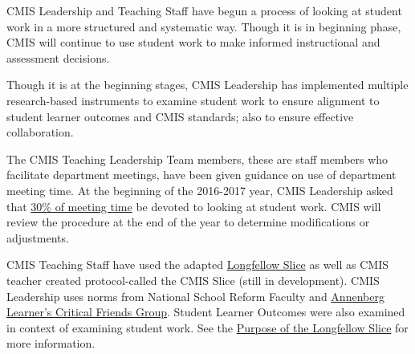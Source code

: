 \documentclass{report}
\begin{document}


\begin{findings}
CMIS Leadership and Teaching Staff have begun a process of looking at student work in a more structured and systematic way. Though it is in beginning phase, CMIS will continue to use student work to make informed instructional and assessment decisions. 

 
Though it is at the beginning stages, CMIS Leadership has implemented multiple research-based instruments to examine student work to ensure  alignment to student learner outcomes and CMIS standards; also to ensure effective collaboration. 

The CMIS Teaching Leadership Team members, these are staff members who facilitate department meetings, have been given guidance on use of department meeting time. At the beginning of the 2016-2017 year, CMIS Leadership asked that \href{https://docs.google.com/a/cmis.ac.th/presentation/d/11Wq8TM-_m7aCMtXKXjWWx5iQ52lH1EOPMP0RmcLnmTA/edit?usp=sharing}{30\% of meeting time} be devoted to looking at student work. CMIS will review the procedure at the end of the year to determine modifications or adjustments. 

CMIS Teaching Staff have used the adapted \href{https://docs.google.com/a/cmis.ac.th/document/d/1aobA3IksQDoGJ-JKci0YDfFDCgT2ugHM7r_T4i_CL7o/edit?usp=sharing}{Longfellow Slice} as well as CMIS teacher created protocol-called the CMIS Slice (still in development). CMIS Leadership uses norms from National School Reform Faculty and \href{https://drive.google.com/a/cmis.ac.th/file/d/0ByVFfrm0zfoleTBsYnhNUFZHbVE/view?usp=sharing}{Annenberg Learner’s Critical Friends Group}. Student Learner Outcomes were also examined in context of examining student work. See the \href{https://docs.google.com/a/cmis.ac.th/document/d/1En9qeldzNSJDHs7m_jRRqNUx6v1EMKD_5MRH0GJsFQM/edit?usp=sharing}{Purpose of the Longfellow Slice} for more information.  


\end{findings}
\end{document}
